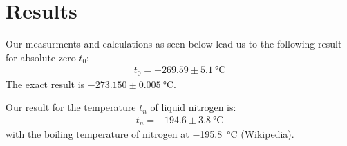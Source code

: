 \section{Results}

Our measurments and calculations as seen below lead us to the following result for absolute zero $t_0$:
\begin{align}
	t_0 = -269.59 \pm \SI{5.1}{\degreeCelsius} 
\end{align}
The exact result is $-273.150 \pm \SI{0.005}{\degreeCelsius}$. 


Our result for the temperature $t_n$ of liquid nitrogen is:
\begin{align}
	t_n = -194.6 \pm \SI{3.8}{\degreeCelsius} 
\end{align}
with the boiling temperature of nitrogen at \SI{-195.8}{\degreeCelsius} (Wikipedia).
